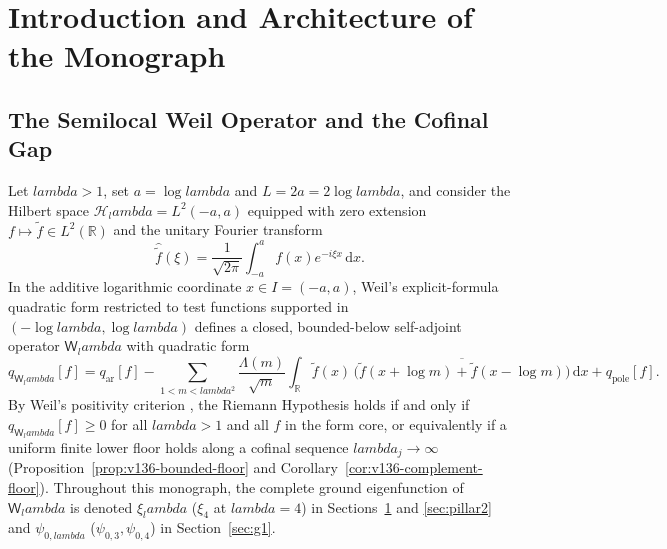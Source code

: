 \documentclass[11pt]{article}
\def\lambda{lambda}%
\theoremstyle{remark}
\newcommand{\dd}{\mathrm d}
\begin{document}
\begin{abstract}
(\texttt{NS-55}); the boundary-free dual-pole Chebyshev--Legendre Stieltjes identity and closed-form odd pole moment $+0.01333431378871523222883\dots$ of $x\,h(x)$ (); and Nyman--Beurling / B\'aez-Duarte canonical sharp-cutoff, same-Gram unitary atom-transformation countermodel $\sigma_n^{(\beta)}=U_\beta\sigma_n$ with floor $F_\beta=(2\beta-1)(1-\beta)^2/\beta^6>0$ (\texttt{NS-74}), and critical-zero $\liminf_{N\to\infty}(\log N)E_N^{(q)}\ge \sum_{\rho\in\mathcal Z_c} m_\rho^2/|\rho|^{2q}$ decay-floor obstructions (\texttt{NS-83}). All fixed-window and obstruction results are unconditional theorems; the cofinal uniform positivity margin (\texttt{WEIL-FLOOR} / Goal G2), nonsummable dyadic gain (\texttt{NB-GAIN}), and the Riemann Hypothesis remain open.
\end{abstract}

\tableofcontents
\newpage

\section{Introduction and Architecture of the Monograph}\label{sec:intro}

\subsection{The Semilocal Weil Operator and the Cofinal Gap}
Let $\lambda>1$, set $a=\log\lambda$ and $L=2a=2\log\lambda$, and consider the Hilbert space $\mathcal H_\lambda = L^2(-a,a)$ equipped with zero extension $f\mapsto \widetilde f\in L^2(\mathbb R)$ and the unitary Fourier transform
\[
 \widehat{\widetilde f}(\xi) = \frac{1}{\sqrt{2\pi}}\int_{-a}^{a} f(x)e^{-i\xi x}\,\dd x.
\]
In the additive logarithmic coordinate $x\in I=(-a,a)$, Weil's explicit-formula quadratic form restricted to test functions supported in $(-\log\lambda,\log\lambda)$ defines a closed, bounded-below self-adjoint operator $\mathsf W_\lambda$ with quadratic form
\begin{equation}\label{eq:intro-weil-form}
 q_{\mathsf W_\lambda}[f] = q_{\mathrm{ar}}[f] - \sum_{1<m<\lambda^2}\frac{\Lambda(m)}{\sqrt m}\int_{\mathbb R}\widetilde f(x)\,\overline{\bigl(\widetilde f(x+\log m)+\widetilde f(x-\log m)\bigr)}\,\dd x + q_{\mathrm{pole}}[f].
\end{equation}
By Weil's positivity criterion \cite{BurnolExplicit2000,ConnesConsaniMoscovici2025}, the Riemann Hypothesis holds if and only if $q_{\mathsf W_\lambda}[f]\ge 0$ for all $\lambda>1$ and all $f$ in the form core, or equivalently if a uniform finite lower floor holds along a cofinal sequence $\lambda_j\to\infty$ (Proposition~\ref{prop:v136-bounded-floor} and Corollary~\ref{cor:v136-complement-floor}). Throughout this monograph, the complete ground eigenfunction of $\mathsf W_\lambda$ is denoted $\xi_\lambda$ ($\xi_4$ at $\lambda=4$) in Sections~\ref{sec:intro} and \ref{sec:pillar2} and $\psi_{0,\lambda}$ ($\psi_{0,3},\psi_{0,4}$) in Section~\ref{sec:g1}.
\end{document}
